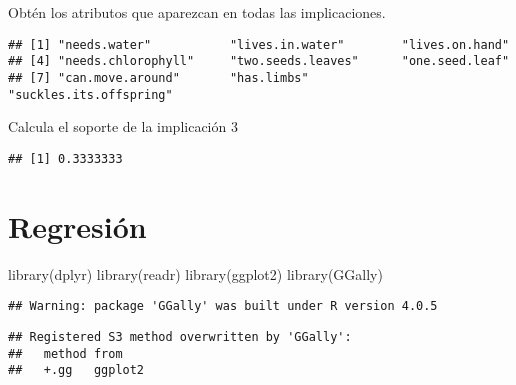 \documentclass[
]{book}
\newenvironment{Shaded}{\begin{snugshade}}{\end{snugshade}}
\newcommand{\DecValTok}[1]{\textcolor[rgb]{0.00,0.00,0.81}{#1}}
\newcommand{\FunctionTok}[1]{\textcolor[rgb]{0.00,0.00,0.00}{#1}}
\newcommand{\NormalTok}[1]{#1}
\newcommand{\SpecialCharTok}[1]{\textcolor[rgb]{0.00,0.00,0.00}{#1}}
\begin{document}
Obtén los atributos que aparezcan en todas las implicaciones.

\begin{Shaded}
\end{Shaded}

\begin{verbatim}
## [1] "needs.water"           "lives.in.water"        "lives.on.hand"        
## [4] "needs.chlorophyll"     "two.seeds.leaves"      "one.seed.leaf"        
## [7] "can.move.around"       "has.limbs"             "suckles.its.offspring"
\end{verbatim}

Calcula el soporte de la implicación 3

\begin{Shaded}
\end{Shaded}

\begin{verbatim}
## [1] 0.3333333
\end{verbatim}

\hypertarget{regresiuxf3n}{%
\chapter{Regresión}\label{regresiuxf3n}}

\begin{Shaded}
\begin{Highlighting}[]
\FunctionTok{library}\NormalTok{(dplyr)}
\FunctionTok{library}\NormalTok{(readr)}
\FunctionTok{library}\NormalTok{(ggplot2)}
\FunctionTok{library}\NormalTok{(GGally)}
\end{Highlighting}
\end{Shaded}

\begin{verbatim}
## Warning: package 'GGally' was built under R version 4.0.5
\end{verbatim}

\begin{verbatim}
## Registered S3 method overwritten by 'GGally':
##   method from   
##   +.gg   ggplot2
\end{verbatim}
\end{document}
